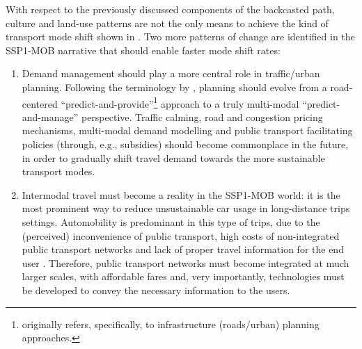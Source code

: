 With respect to the previously discussed components of the backcasted path, culture and land-use patterns are not the only means to achieve the kind of transport mode shift shown in . Two more patterns of change are identified in the SSP1-MOB narrative that should enable faster mode shift rates:
%
\begin{enumerate}
\item Demand management should play a more central role in traffic/urban planning. Following the terminology by \textcite{goodwin2012_ProvidingRoadCapacity}, planning should evolve from a road-centered ``predict-and-provide''\footnote{\textcite{goodwin2012_ProvidingRoadCapacity} originally refers, specifically, to infrastructure (roads/urban) planning approaches.} approach to a truly multi-modal ``predict-and-manage'' perspective. Traffic calming, road and congestion pricing mechanisms, multi-modal demand modelling and public transport facilitating policies (through, e.g., subsidies) should become commonplace in the future, in order to gradually shift travel demand towards the more sustainable transport modes.
\item Intermodal travel must become a reality in the SSP1-MOB world: it is the most prominent way to reduce unsustainable car usage in long-distance trips settings. Automobility is predominant in this type of trips, due to the (perceived) inconvenience of public transport, high costs of non-integrated public transport networks and lack of proper travel information for the end user \parencite{riley2010_IntermodalPassengerTransport}. Therefore, public transport networks must become integrated at much larger scales, with affordable fares and, very importantly, technologies must be developed to convey the necessary information to the users.
\end{enumerate}
